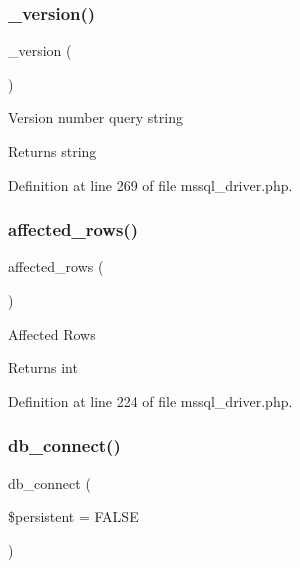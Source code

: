 \subsubsection{\texorpdfstring{\_version()}{\_version()}}
{\footnotesize\ttfamily \+\_\+version (\begin{DoxyParamCaption}{ }\end{DoxyParamCaption})\hspace{0.3cm}{\ttfamily [protected]}}

Version number query string

\begin{DoxyReturn}{Returns}
string 
\end{DoxyReturn}


Definition at line 269 of file mssql\+\_\+driver.\+php.

\mbox{\label{class_c_i___d_b__mssql__driver_a77248aaad33eb132c04cc4aa3f4bc8cb}} 
\subsubsection{\texorpdfstring{affected\_rows()}{affected\_rows()}}
{\footnotesize\ttfamily affected\+\_\+rows (\begin{DoxyParamCaption}{ }\end{DoxyParamCaption})}

Affected Rows

\begin{DoxyReturn}{Returns}
int 
\end{DoxyReturn}


Definition at line 224 of file mssql\+\_\+driver.\+php.

\mbox{\label{class_c_i___d_b__mssql__driver_a52bf595e79e96cc0a7c907a9b45aeb4d}} 
\subsubsection{\texorpdfstring{db\_connect()}{db\_connect()}}
{\footnotesize\ttfamily db\+\_\+connect (\begin{DoxyParamCaption}\item[{}]{\$persistent = {\ttfamily FALSE} }\end{DoxyParamCaption})}


